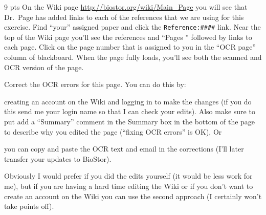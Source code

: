 \documentclass[11pt]{article}
\begin{document}
\begin{compactenum}
	\item {\color{red} 9 pts} On the Wiki page \url{http://biostor.org/wiki/Main_Page} you will see that Dr.\ Page has added links to each of the references that we are using for this exercise.  Find ``your'' assigned paper and click the {\tt Reference:\#\#\#\#} link. Near the top of the Wiki page you'll see the references and ``Pages '' followed by links to each page.
		Click on the page number that is assigned to you in the ``OCR page'' column of blackboard.
		When the page fully loads, you'll see both the scanned and OCR version of the page.  

		Correct the OCR errors for this page.  
		You can do this by:
		 \begin{compactenum}
		 	\item creating an account on the Wiki and logging in to make the changes (if you do this send me your login name so that I can check your edits). Also make sure to put add a ``Summary'' comment in the Summary box in the bottom of the page to describe why you edited the page (``fixing OCR errors'' is OK),  Or
			\item you can copy and paste the OCR text and email in the corrections (I'll later transfer your updates to BioStor).
		 \end{compactenum}
		Obviously I would prefer if you did the edits yourself (it would be less work for me), but if you are having a hard time editing the Wiki or if you don't want to create an account on the Wiki you can use the second approach (I certainly won't take points off).
\end{compactenum} 




 
\end{document}
